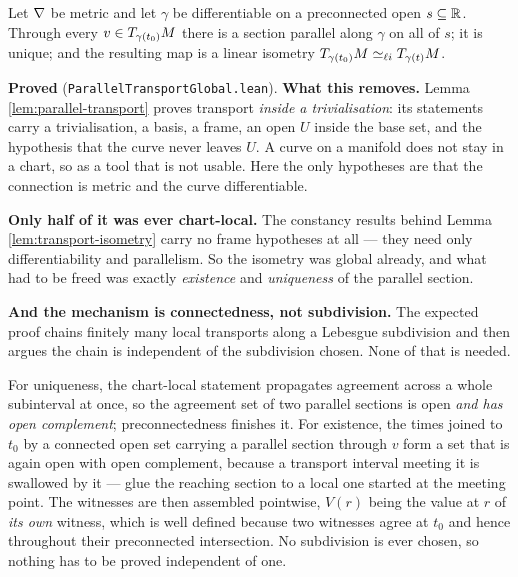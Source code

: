 \begin{lemma}
  \label{lem:transport-global}
  \leanok
  Let $\nabla$ be metric and let $\gamma$ be differentiable on a preconnected open
  $s \subseteq \mathbb{R}$. Through every $v \in T_{\gamma(t_0)}M$ there is a section parallel along
  $\gamma$ on all of $s$; it is unique; and the resulting map is a linear isometry
  $T_{\gamma(t_0)}M \simeq_{\ell i} T_{\gamma(t)}M$.

  \textbf{Proved} (\texttt{ParallelTransportGlobal.lean}). \textbf{What this removes.} Lemma
  \ref{lem:parallel-transport} proves transport \emph{inside a trivialisation}: its statements
  carry a trivialisation, a basis, a frame, an open $U$ inside the base set, and the
  hypothesis that the curve never leaves $U$. A curve on a manifold does not stay in a chart,
  so as a tool that is not usable. Here the only hypotheses are that the connection is metric
  and the curve differentiable.

  \textbf{Only half of it was ever chart-local.} The constancy results behind Lemma
  \ref{lem:transport-isometry} carry no frame hypotheses at all --- they need only
  differentiability and parallelism. So the isometry was global already, and what had to be
  freed was exactly \emph{existence} and \emph{uniqueness} of the parallel section.

  \textbf{And the mechanism is connectedness, not subdivision.} The expected proof chains
  finitely many local transports along a Lebesgue subdivision and then argues the chain is
  independent of the subdivision chosen. None of that is needed.

  For uniqueness, the chart-local statement propagates agreement across a whole subinterval at
  once, so the agreement set of two parallel sections is open \emph{and has open complement};
  preconnectedness finishes it. For existence, the times joined to $t_0$ by a connected open
  set carrying a parallel section through $v$ form a set that is again open with open
  complement, because a transport interval meeting it is swallowed by it --- glue the reaching
  section to a local one started at the meeting point. The witnesses are then assembled
  pointwise, $V(r)$ being the value at $r$ of \emph{its own} witness, which is well defined
  because two witnesses agree at $t_0$ and hence throughout their preconnected intersection.
  No subdivision is ever chosen, so nothing has to be proved independent of one.


\end{lemma}
